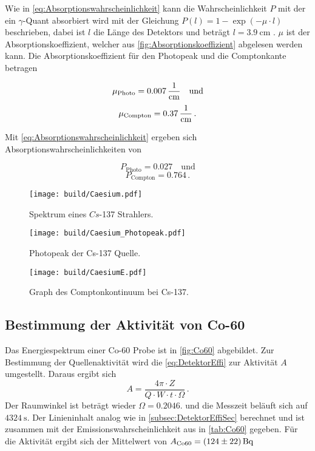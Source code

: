 Wie in \autoref{eq:Absorptionswahrscheinlichkeit} kann die Wahrscheinlichkeit $P$ mit der ein $\gamma$-Quant absorbiert wird mit der Gleichung $P(l) = 1- \exp{(-\mu \cdot l)}$ beschrieben,
dabei ist $l$ die Länge des Detektors und beträgt $l = \SI{3.9}{\centi\meter}$ \cite{v18}.
$\mu$ ist der Absorptionskoeffizient, welcher aus \autoref{fig:Absorptionskoeffizient} abgelesen werden kann. 
Die Absorptionskoeffizient für den Photopeak und die Comptonkante betragen

\begin{equation*}
   \mu_\text{Photo} = \SI{0.007}{\frac{1}{\centi\meter}} \quad \text{und}
\end{equation*}
\begin{equation*}
    \mu_\text{Compton} = \SI{0.37}{\frac{1}{\centi\meter}}\,. 
\end{equation*}

Mit \autoref{eq:Absorptionswahrscheinlichkeit} ergeben sich Absorptionswahrscheinlichkeiten von

\begin{equation*}
    P_\text{Photo} = \num{0.027} \quad \text{und}
 \end{equation*}
\begin{equation*}
     P_\text{Compton} = \num{0.764}\,. 
\end{equation*}


\begin{figure}[H]
    \centering
    \texttt{[image: build/Caesium.pdf]}
    \caption{Spektrum eines $Cs$-137 Strahlers.}
    \label{fig:CeasiumSpektrum}
\end{figure}

\begin{figure}[H]
    \centering
    \texttt{[image: build/Caesium\_Photopeak.pdf]}
    \caption{Photopeak der Cs-137 Quelle.}
    \label{fig:CaesiumPhotopeak}
\end{figure}


\begin{figure}[H]
    \centering
    \texttt{[image: build/CaesiumE.pdf]}
    \caption{Graph des Comptonkontinuum bei Cs-137.}
    \label{fig:Comptonplot}
\end{figure}

\subsection{Bestimmung der Aktivität von Co-60}

Das Energiespektrum einer Co-60 Probe ist in \autoref{fig:Co60} abgebildet.
Zur Bestimmung der Quellenaktivität wird die \autoref{eq:DetektorEffi} zur Aktivität $A$ umgestellt.
Daraus ergibt sich
\begin{equation*}
    A = \frac{4\pi \cdot Z}{Q \cdot W \cdot t \cdot \Omega}\,.
\end{equation*}
Der Raumwinkel ist beträgt wieder $\Omega = 0.2046$. 
und die Messzeit beläuft sich auf $\SI{4324}{\second}$.
Der Linieninhalt analog wie in \autoref{subsec:DetektorEffiSec} berechnet und ist zusammen mit der Emissionswahrscheinlichkeit aus \cite{LNHB} in \autoref{tab:Co60} gegeben.
Für die Aktivität ergibt sich der Mittelwert von $A_\text{Co60} = \SI{124 \pm 22}{\becquerel}$

